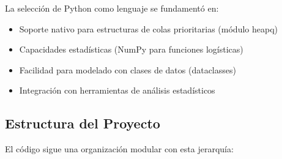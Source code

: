 \documentclass{article}
\begin{document}
La selección de Python como lenguaje se fundamentó en:
\begin{itemize}
    \item Soporte nativo para estructuras de colas prioritarias (módulo heapq)
    \item Capacidades estadísticas (NumPy para funciones logísticas)
    \item Facilidad para modelado con clases de datos (dataclasses)
    \item Integración con herramientas de análisis estadísticos
\end{itemize}

\subsection{Estructura del Proyecto}
El código sigue una organización modular con esta jerarquía:
\end{document}
